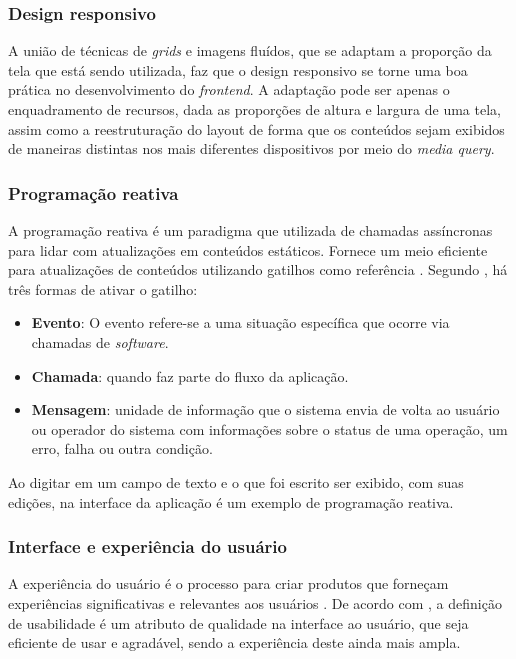 \subsubsection{Design responsivo}
A união de técnicas de \textit{grids} e imagens fluídos, que se adaptam a proporção da tela que está sendo utilizada, faz que o design responsivo se torne uma boa prática no desenvolvimento do \textit{frontend}. A adaptação pode ser apenas o enquadramento de recursos, dada as proporções de altura e largura de uma tela, assim como a reestruturação do layout de forma que os conteúdos sejam exibidos de maneiras distintas nos mais diferentes dispositivos por meio do \textit{media query}. \cite{MOZILA}

\subsubsection{Programação reativa}
A programação reativa é um paradigma que utilizada de chamadas assíncronas para lidar com atualizações em conteúdos estáticos. Fornece um meio eficiente para atualizações de conteúdos utilizando gatilhos como referência \cite{NOLLE}. Segundo , há três formas de ativar o gatilho:
\begin{itemize}
    \item \textbf{Evento}: O evento refere-se a uma situação específica que ocorre via chamadas de \textit{software}.
    \item \textbf{Chamada}: quando faz parte do fluxo da aplicação.
    \item \textbf{Mensagem}: unidade de informação que o sistema envia de volta ao usuário ou operador do sistema com informações sobre o status de uma operação, um erro, falha ou outra condição.
\end{itemize}

Ao digitar em um campo de texto e o que foi escrito ser exibido, com suas edições, na interface da aplicação é um exemplo de programação reativa.

\subsubsection{Interface e experiência do usuário}
A experiência do usuário é o processo para criar produtos que forneçam experiências significativas e relevantes aos usuários \cite{UX}. De acordo com , a definição de usabilidade é um atributo de qualidade na interface ao usuário, que seja eficiente de usar e agradável, sendo a experiência deste ainda mais ampla. 

